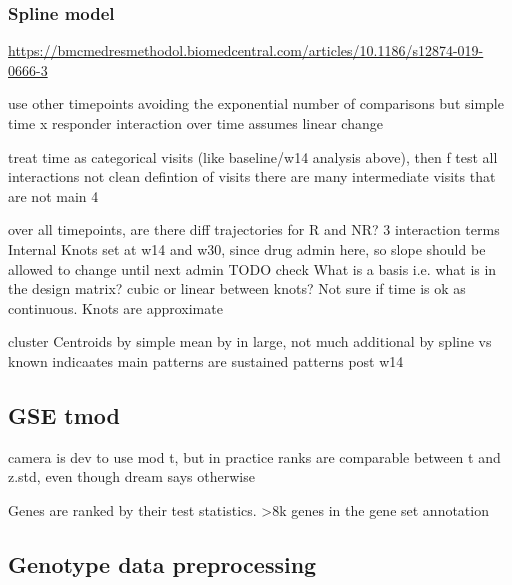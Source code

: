 \begin{outline}
\subsubsection{Spline model}

\url{https://bmcmedresmethodol.biomedcentral.com/articles/10.1186/s12874-019-0666-3}

use other timepoints avoiding the exponential number of comparisons
but simple time x responder interaction over time assumes linear change

treat time as categorical visits (like baseline/w14 analysis above), then f test all interactions
    not clean defintion of visits
    there are many intermediate visits that are not main 4

over all timepoints, are there diff trajectories for R and NR?
3 interaction terms
Internal Knots set at w14 and w30, since drug admin here, so slope should be allowed to change until next admin
TODO check What is a basis i.e. what is in the design matrix?
cubic or linear between knots?
Not sure if time is ok as continuous. Knots are approximate

cluster
    Centroids by simple mean
    by in large,
    not much additional by spline vs known
    indicaates main patterns are sustained patterns post w14

\subsection{GSE tmod}

camera is dev to use mod t, but in practice ranks are comparable between t and z.std, even though dream says otherwise

Genes are ranked by their test statistics.
>8k genes in the gene set annotation

\subsection{Genotype data preprocessing}

%
%
%
%


\end{outline}
